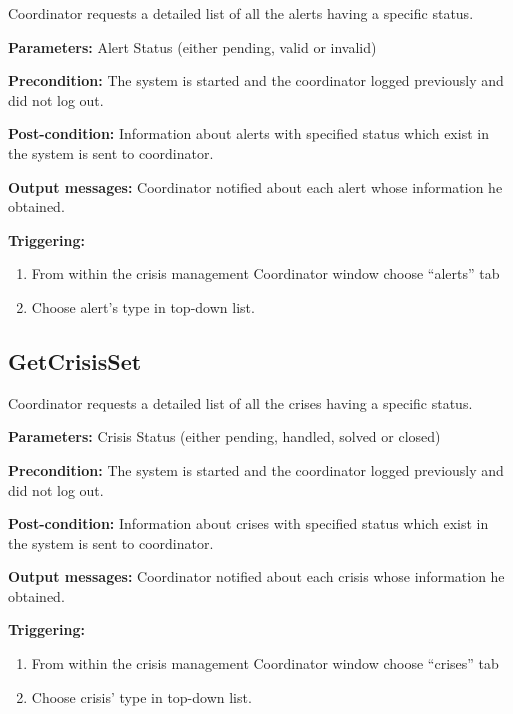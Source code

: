 Coordinator requests a detailed list of all the alerts having a specific status.

\begin{description}

\item \textbf{Parameters:} Alert Status (either pending, valid or invalid)
\item \textbf{Precondition:} The system is started and the coordinator logged
previously and did not log out.
\item \textbf{Post-condition:} Information about alerts with specified status
which exist in the system is sent to coordinator.
\item \textbf{Output messages:} Coordinator notified about each alert whose
information he obtained.

\item \textbf{Triggering:}
\begin{enumerate}
\item From within the crisis management Coordinator window choose ``alerts'' tab
\item Choose alert's type in top-down list.
\end{enumerate}

\end{description}

\subsection{GetCrisisSet}

Coordinator requests a detailed list of all the crises having a specific status.

\begin{description}

\item \textbf{Parameters:} Crisis Status (either pending, handled, solved or
closed)
\item \textbf{Precondition:} The system is started and the coordinator logged
previously and did not log out. 
\item \textbf{Post-condition:} Information about crises with specified status
which exist in the system is sent to coordinator.
\item \textbf{Output messages:} Coordinator notified about each crisis whose
information he obtained.

\item \textbf{Triggering:}
\begin{enumerate}
\item From within the crisis management Coordinator window choose ``crises'' tab
\item Choose crisis' type in top-down list.
\end{enumerate}

\end{description}

